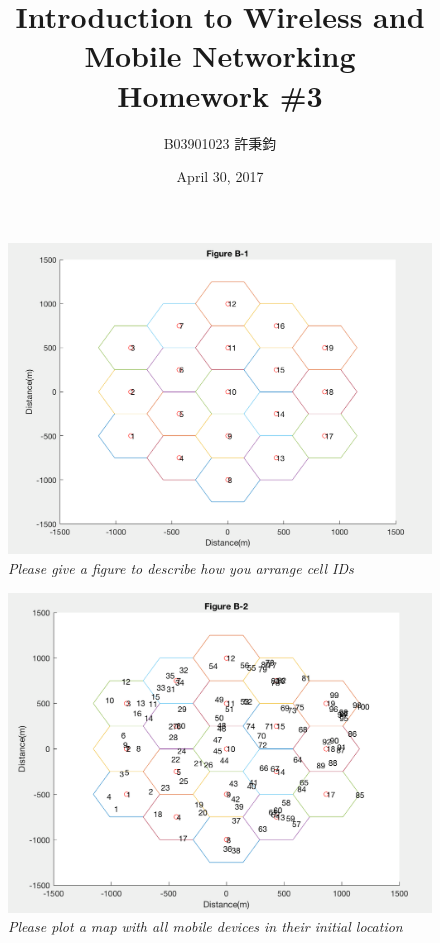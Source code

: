 \documentclass{article}
\title{Introduction to Wireless and Mobile Networking\\ Homework \#3}
\author{B03901023 許秉鈞}
\date{April 30, 2017} %
\begin{document}
\maketitle

\begin{figure}[h]
    \centering
    \includegraphics[width=1\textwidth]{fig1}
    \caption{\textit{Please give a figure to describe how you arrange cell IDs}}
    \label{fig:mesh1}
\end{figure}

\begin{figure}[h]
    \centering
    \includegraphics[width=1\textwidth]{fig2}
    \caption{\textit{Please plot a map with all mobile devices in their initial location}}
    \label{fig:mesh2}
\end{figure}
\end{document}
